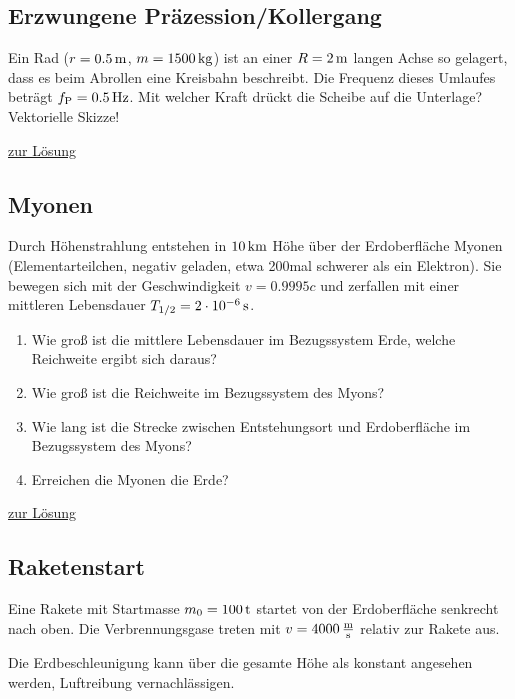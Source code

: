 \documentclass[a4paper]{scrartcl}
\begin{document}
\subsection{Erzwungene Präzession/Kollergang}
\label{aufg:Kollergang}
Ein Rad ($r = \unit[0.5]{m}$, $m=\unit[1500]{kg}$) ist an einer $R = \unit[2]{m}$ langen Achse so gelagert, dass es beim Abrollen eine Kreisbahn beschreibt. Die Frequenz dieses Umlaufes beträgt $f_\text{P} = \unit[0.5]{Hz}$. Mit welcher Kraft drückt die Scheibe auf die Unterlage? Vektorielle Skizze!

\hyperref[lsg:Kollergang]{zur Lösung}

\subsection{Myonen}
\label{aufg:Myonen}
Durch Höhenstrahlung entstehen in $\unit[10]{km}$ Höhe über der Erdoberfläche Myonen (Elementarteilchen, negativ geladen, etwa 200mal schwerer als ein Elektron). Sie bewegen sich mit der Geschwindigkeit $v = 0.9995c$ und zerfallen mit einer mittleren Lebensdauer $T_{1/2} = \unit[2\cdot 10^{-6}]{s}$.
\begin{enumerate}[noitemsep]
  \item Wie groß ist die mittlere Lebensdauer im Bezugssystem Erde, welche Reichweite ergibt sich daraus?
  \item Wie groß ist die Reichweite im Bezugssystem des Myons?
  \item Wie lang ist die Strecke zwischen Entstehungsort und Erdoberfläche im Bezugssystem des Myons?
  \item Erreichen die Myonen die Erde?
\end{enumerate}

\hyperref[lsg:Myonen]{zur Lösung}

\subsection{Raketenstart}
\label{aufg:Raketenstart}
Eine Rakete mit Startmasse $m_0 =\unit[100]{t}$ startet von der Erdoberfläche senkrecht nach oben. Die Verbrennungsgase treten mit $v = \unit[4000]{\frac{m}{s}}$ relativ zur Rakete aus.

Die Erdbeschleunigung kann über die gesamte Höhe als konstant angesehen werden, Luftreibung vernachlässigen.
\end{document}
